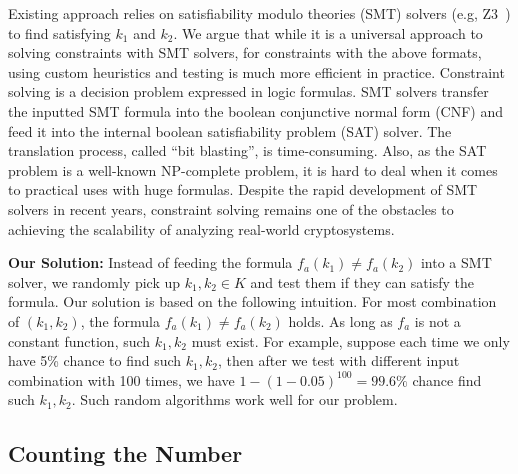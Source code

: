 Existing approach relies on satisfiability modulo theories (SMT) solvers 
(e.g, Z3~\cite{DeMoura:2008:ZES:1792734.1792766}) to find satisfying 
$k_1$ and $k_2$.
We argue that while it is a universal approach to solving constraints 
with SMT solvers, for constraints with the above formats, using custom 
heuristics and testing is much more efficient in practice. Constraint 
solving is a decision problem expressed in logic formulas. SMT solvers 
transfer the inputted SMT formula into the boolean conjunctive normal 
form (CNF) and feed it into the internal boolean satisfiability 
problem (SAT) solver. The translation process, called ``bit blasting'', 
is time-consuming. Also, as the SAT problem is a well-known NP-complete 
problem, it is hard to deal when it comes to
practical uses with huge formulas. Despite the rapid development 
of SMT solvers in recent years, constraint solving remains one of 
the obstacles to achieving the scalability of analyzing real-world cryptosystems.

\textbf{Our Solution:}
Instead of feeding the formula $f_a(k_1) \neq f_a(k_2)$ into a SMT solver, we
randomly pick up $k_1, k_2 \in K$ and test them if they can satisfy the
formula. Our solution is based on the following intuition. For most combination
of $(k_{1}, k_{2} )$, the formula $f_a(k_1) \neq f_a(k_2)$ holds. As long as
$f_a$ is not a constant function, such $k_1, k_2$ must exist. For example,
suppose each time we only have 5\% chance to find such $k_1, k_2$, then after we
test with different input combination with 100 times, we have $1 -
(1-0.05)^{100} = 99.6\%$ chance find such $k_1, k_2$. Such random algorithms
work well for our problem.

\subsection{Counting the Number}
\label{MCreasons}


